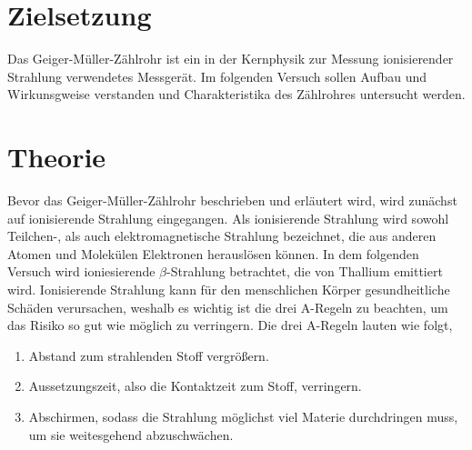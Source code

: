 \section{Zielsetzung}
\label{sec:ziel}
Das Geiger-Müller-Zählrohr ist ein in der Kernphysik zur Messung ionisierender Strahlung verwendetes Messgerät. Im folgenden Versuch sollen Aufbau 
und Wirkunsgweise verstanden und Charakteristika des Zählrohres untersucht werden.

\section{Theorie}
\label{sec:Theorie}

Bevor das Geiger-Müller-Zählrohr beschrieben und erläutert wird, wird zunächst auf ionisierende Strahlung eingegangen.
Als ionisierende Strahlung wird sowohl Teilchen-, als auch elektromagnetische Strahlung bezeichnet, die aus anderen Atomen und Molekülen Elektronen herauslösen können.
In dem folgenden Versuch wird ioniesierende $\beta$-Strahlung betrachtet, die von Thallium emittiert wird.
Ionisierende Strahlung kann für den menschlichen Körper gesundheitliche Schäden verursachen, weshalb es wichtig ist die drei A-Regeln zu beachten, um das Risiko so gut wie möglich zu verringern.
Die drei A-Regeln lauten wie folgt,
\begin{enumerate}
    \item Abstand zum strahlenden Stoff vergrößern.
    \item Aussetzungszeit, also die Kontaktzeit zum Stoff, verringern.
    \item Abschirmen, sodass die Strahlung möglichst viel Materie durchdringen muss, um sie weitesgehend abzuschwächen.
\end{enumerate}

